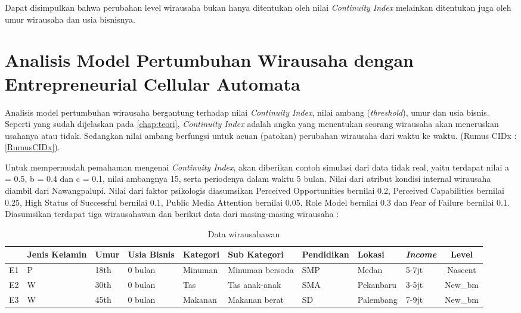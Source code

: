 Dapat disimpulkan bahwa perubahan level wirausaha bukan hanya ditentukan oleh nilai \textit{Continuity Index} melainkan ditentukan juga oleh umur wirausaha dan usia bisnisnya.


\section{Analisis Model Pertumbuhan Wirausaha dengan Entrepreneurial Cellular Automata}
\label{analisismodelCA}

Analisis model pertumbuhan wirausaha bergantung terhadap nilai \textit{Continuity Index}, nilai ambang (\textit{threshold}), umur dan usia bisnis. Seperti yang sudah dijelaskan pada \ref{chap:teori}, \textit{Continuity Index} adalah angka yang menentukan seorang wirausaha akan meneruskan usahanya atau tidak. Sedangkan nilai ambang berfungsi untuk acuan (patokan) perubahan wirausaha dari waktu ke waktu. (Rumus CIDx : \ref{RumusCIDx}).


Untuk mempermudah pemahaman mengenai \textit{Continuity Index}, akan diberikan contoh simulasi dari data tidak real, yaitu terdapat nilai a = 0.5, b = 0.4 dan c = 0.1, nilai ambangnya 15, serta periodenya dalam waktu 5 bulan. Nilai dari atribut kondisi internal wirausaha diambil dari Nawangpalupi\cite{GEM2013}. Nilai dari faktor psikologis diasumsikan Perceived Opportunities bernilai 0.2, Perceived Capabilities bernilai 0.25, High Status of Successful bernilai 0.1, Public Media Attention bernilai 0.05, Role Model bernilai 0.3 dan Fear of Failure bernilai 0.1. Diasumsikan terdapat tiga wirausahawan dan berikut data dari masing-masing wirausaha :
				
\begin{table} [H]
\centering
\caption{Data wirausahawan}
\begin{tabular}{|c|p{1cm}|p{1cm}|p{1cm}|p{2cm}|p{2cm}|p{2cm}|p{2cm}|p{1cm}|c|}
\hline
& Jenis Kelamin & Umur & Usia Bisnis & Kategori & Sub Kategori & Pendidikan & Lokasi & \textit{Income} & Level\\
\hline
E1 & P & 18th & 0 bulan & Minuman & Minuman bersoda & SMP & Medan & 5-7jt & Nascent\\
\hline
E2 & W & 30th & 0 bulan & Tas & Tas anak-anak  & SMA & Pekanbaru & 3-5jt & New\_bm\\
\hline
E3 & W & 45th & 0 bulan & Makanan & Makanan berat & SD & Palembang & 7-9jt & New\_bm\\
\hline
\end{tabular}
\end{table}

